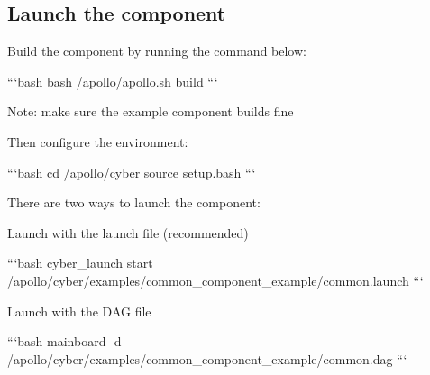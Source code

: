 \subsection*{Launch the component}

Build the component by running the command below\-:

```bash bash /apollo/apollo.sh build ```

Note\-: make sure the example component builds fine

Then configure the environment\-:

```bash cd /apollo/cyber source setup.\-bash ```

There are two ways to launch the component\-:


\begin{DoxyItemize}
\item Launch with the launch file (recommended)
\end{DoxyItemize}

```bash cyber\-\_\-launch start /apollo/cyber/examples/common\-\_\-component\-\_\-example/common.launch ```


\begin{DoxyItemize}
\item Launch with the D\-A\-G file
\end{DoxyItemize}

```bash mainboard -\/d /apollo/cyber/examples/common\-\_\-component\-\_\-example/common.dag ``` 